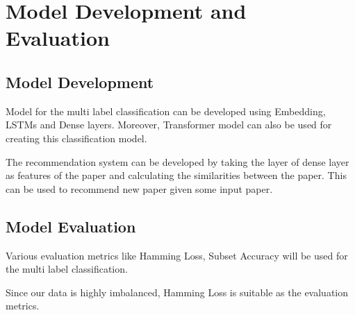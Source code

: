\chapter{Model Development and Evaluation}

\section{Model Development}
Model for the multi label classification can be developed using Embedding, LSTMs and Dense layers. Moreover, Transformer model can also be used for creating this classification model.

The recommendation system can be developed by taking the layer of dense layer as features of the paper and calculating the similarities between the paper. This can be used to recommend new paper given some input paper.

\section{Model Evaluation}
Various evaluation metrics like Hamming Loss, Subset Accuracy will be used for the multi label classification.

Since our data is highly imbalanced, Hamming Loss is suitable as the evaluation metrics.